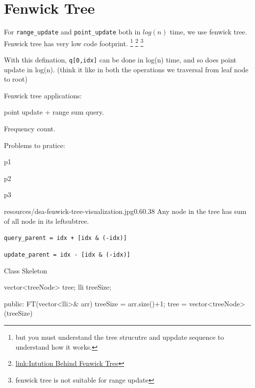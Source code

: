 \chapter{Fenwick Tree}\label{chp:fenwick_tree}

For \verb|range_update| and \verb|point_update| both in $log(n)$ time, we use fenwick tree.
Fenwick tree has very low code footprint. \footnote{but you must understand the tree strucutre and uppdate sequence to understand how it works.}
\footnote{
\href{https://cs.stackexchange.com/questions/10538/bit-what-is-the-intuition-behind-a-binary-indexed-tree-and-how-was-it-thought-a}{link:Intution Behind Fenwick Tree}}
\footnote{fenwick tree is not suitable for range update}

With this defination, \verb|q[0,idx]| can be done in log(n) time, and so does point update in log(n). (think it like in both the operations we traversal from leaf node to root)

Fenwick tree applications:
\begin{compactenum}
    \item point update + range sum query.
    \item Frequency count.
    \item 
\end{compactenum}

Problems to pratice:
\begin{compactenum}
    \item p1
    \item p2
    \item p3
\end{compactenum}
\newpage

\begin{lfigure}{resources/dsa-fenwick-tree-visualization.jpg}{0.6}{0.38}
    Any node in the tree has sum of all node in its leftsubtree.
    \vspace{1cm}

    \verb|query_parent = idx + [idx & (-idx)]|

    \verb|update_parent = idx - [idx & (-idx)]|

    \vspace{2cm}
    Class Skeleton
    \begin{code3}

    vector<treeNode> tree;
    lli treeSize;

    public:
    FT(vector<lli>& arr)
    {
        treeSize = arr.size()+1;
        tree = 
        vector<treeNode>(treeSize)
    }
    \end{code3}

\end{lfigure}

